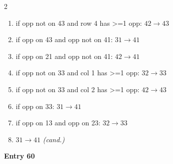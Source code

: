\begin{multicols}{2}
\begin{tikzpicture}[scale=0.24]
\end{tikzpicture}
\nopagebreak\begin{enumerate}[topsep=1pt,itemsep=0pt,parsep=0pt,leftmargin=2.2em,label=\arabic*.]
\item if opp not on 43 and row 4 has >=1 opp: $42\!\to\!43$
\item if opp on 43 and opp not on 41: $31\!\to\!41$
\item if opp on 21 and opp not on 41: $42\!\to\!41$
\item if opp not on 33 and col 1 has >=1 opp: $32\!\to\!33$
\item if opp not on 33 and col 2 has >=1 opp: $42\!\to\!43$
\item if opp on 33: $31\!\to\!41$
\item if opp on 13 and opp on 23: $32\!\to\!33$
\item $31\!\to\!41$ \hfill\textit{(cand.)}
\end{enumerate}\smallskip
\noindent\textbf{Entry 60} \; 
\end{multicols}
